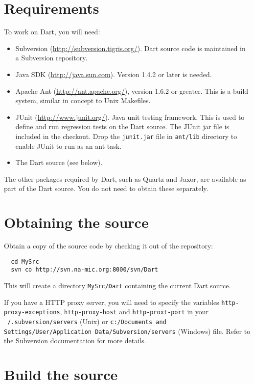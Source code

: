 \documentclass{InsightBook}
\newcommand{\filename}[1]{\texttt{#1}}
\begin{document}
\section{Requirements}
\label{Section:Development}

To work on Dart, you will need:
\begin{itemize}
\item Subversion (\url{http://subversion.tigris.org/}). Dart source code is
  maintained in a Subversion repository.
\item Java SDK (\url{http://java.sun.com}).  Version 1.4.2 or later is
needed.
\item Apache Ant (\url{http://ant.apache.org/}), version 1.6.2 or
  greater. This is a build system, similar in concept to Unix
  Makefiles.
\item JUnit (\url{http://www.junit.org/}). Java unit testing
  framework. This is used to define and run regression tests on the
  Dart source.  The JUnit jar file is included in the checkout.  Drop
the \filename{junit.jar} file in \filename{ant/lib} directory to enable
JUnit to run as an ant task.
\item The Dart source (see below).
\end{itemize}

The other packages required by Dart, such as Quartz and Jaxor, are
available as part of the Dart source. You do not need to obtain these
separately.

\section{Obtaining the source}

Obtain a copy of the source code by checking it out of the repository:
\begin{verbatim}
  cd MySrc
  svn co http://svn.na-mic.org:8000/svn/Dart
\end{verbatim}
This will create a directory \filename{MySrc/Dart} containing the
current Dart source.

If you have a HTTP proxy server, you will need to specify the
variables \texttt{http-proxy-exceptions}, \texttt{http-proxy-host} and
\texttt{http-proxt-port} in your \filename{~/.subversion/servers} (Unix)
or \filename{c:/Documents and Settings/User/Application
Data/Subversion/servers} (Windows)
file. Refer to the Subversion documentation for more details.


\section{Build the source}
\end{document}
